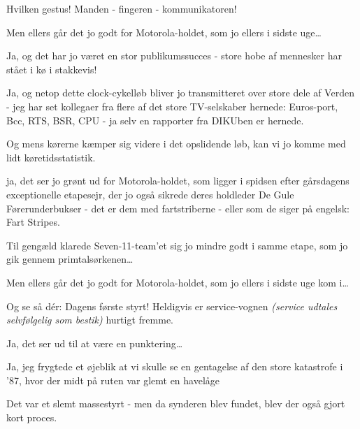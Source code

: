 \documentclass[10pt]{article}
\begin{document}
\begin{sketch}
 Hvilken gestus! Manden - fingeren - kommunikatoren!

 Men ellers går det jo godt for Motorola-holdet, som jo ellers i
sidste uge\ldots

 Ja, og det har jo været en stor publikumssucces - store hobe af
mennesker har stået i kø i stakkevis!


 Ja, og netop dette clock-cykelløb bliver jo transmitteret over store
dele af Verden - jeg har set kollegaer fra flere af det store TV-selskaber
hernede: Euros-port, Bcc, RTS, BSR, CPU - ja selv en rapporter fra DIKUben er
hernede.

 Og mens kørerne kæmper sig videre i det opslidende løb, kan vi jo
komme med lidt køretidsstatistik.

 ja, det ser jo grønt ud for Motorola-holdet, som ligger i spidsen   
 efter gårsdagens exceptionelle etapesejr, der jo også sikrede deres holdleder
 De Gule Førerunderbukser - det er dem med fartstriberne - eller som de siger på
engelsk: Fart Stripes. 

 Til gengæld klarede Seven-11-team'et sig jo mindre godt i samme
etape, som jo gik gennem primtalsørkenen\ldots

 Men ellers går det jo godt for Motorola-holdet, som jo ellers i
sidste uge kom i\ldots


 Og se så dér: Dagens første styrt! Heldigvis er service-vognen {\em
(service udtales selvfølgelig som bestik)} hurtigt fremme.

 Ja, det ser ud til at være en punktering\ldots


 Ja, jeg frygtede et øjeblik at vi skulle se en gentagelse af den
store katastrofe i '87, hvor der midt på ruten var glemt en havelåge

 Det var et slemt massestyrt - men da synderen blev fundet, blev der
også gjort kort proces.


\end{sketch}
\end{document}
